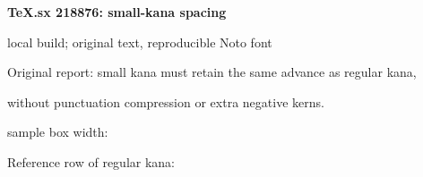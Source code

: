 \documentclass{article}
\providecommand\BuildLabel{local build}
\begin{document}
{\Large\bfseries TeX.sx 218876: small-kana spacing}\par
{\small \BuildLabel; original text, reproducible Noto font}\par\bigskip

{\large Original report: small kana must retain the same advance as regular kana,\par
without punctuation compression or extra negative kerns.}\par\bigskip

\begin{center}
  \sbox{}
  \fbox{\usebox\ReportedSample}\par
  \small sample box width: \the\wd\ReportedSample
\end{center}

\medskip
{\large Reference row of regular kana:}\par\medskip
\begin{center}
\end{center}
\end{document}
